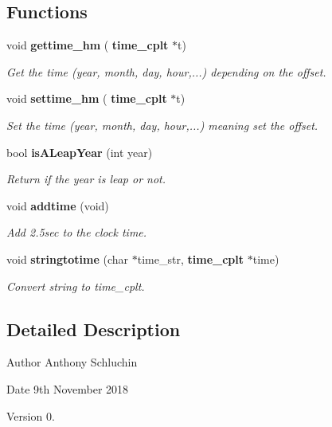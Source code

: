 \subsection*{Functions}
\begin{DoxyCompactItemize}
\item 
void \textbf{ gettime\+\_\+hm} (\textbf{ time\+\_\+cplt} $\ast$t)
\begin{DoxyCompactList}\small\item\em Get the time (year, month, day, hour,...) depending on the offset. \end{DoxyCompactList}\item 
void \textbf{ settime\+\_\+hm} (\textbf{ time\+\_\+cplt} $\ast$t)
\begin{DoxyCompactList}\small\item\em Set the time (year, month, day, hour,...) meaning set the offset. \end{DoxyCompactList}\item 
bool \textbf{ is\+A\+Leap\+Year} (int year)
\begin{DoxyCompactList}\small\item\em Return if the year is leap or not. \end{DoxyCompactList}\item 
void \textbf{ addtime} (void)
\begin{DoxyCompactList}\small\item\em Add 2.\+5sec to the clock time. \end{DoxyCompactList}\item 
void \textbf{ stringtotime} (char $\ast$time\+\_\+str, \textbf{ time\+\_\+cplt} $\ast$time)
\begin{DoxyCompactList}\small\item\em Convert string to time\+\_\+cplt. \end{DoxyCompactList}\end{DoxyCompactItemize}


\subsection{Detailed Description}
\begin{DoxyAuthor}{Author}
Anthony Schluchin 
\end{DoxyAuthor}
\begin{DoxyDate}{Date}
9th November 2018 
\end{DoxyDate}
\begin{DoxyVersion}{Version}
0. 
\end{DoxyVersion}



